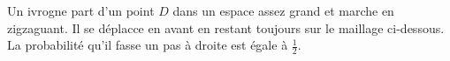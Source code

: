 
\begin{exercice}\label{exosmath-0381}

    Un ivrogne part d'un point \( D\) dans un espace assez grand et marche en zigzaguant. Il se déplacce en avant en restant toujours sur le maillage ci-dessous. La probabilité qu'il fasse un pas à droite est égale à \( \frac{ 1 }{2}\).

\end{exercice}
